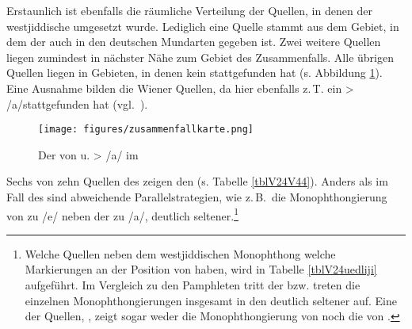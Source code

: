  
 Erstaunlich ist ebenfalls die räumliche Verteilung der Quellen, in denen der westjiddische  umgesetzt wurde. Lediglich eine Quelle stammt aus dem Gebiet, in dem der  auch in den deutschen Mundarten gegeben ist. Zwei weitere Quellen liegen zumindest in nächster Nähe zum Gebiet des Zusammenfalls. Alle übrigen Quellen liegen in Gebieten, in denen kein  stattgefunden hat (s. Abbildung \ref{karteV24V44}). Eine Ausnahme bilden die Wiener Quellen, da hier ebenfalls z.\,T. ein  > /a\textlengthmark/stattgefunden hat (vgl.\, \citealt[233, 235]{Schirmunski1962}).
 
 \begin{figure}
		\centering
\texttt{[image: figures/zusammenfallkarte.png]}
		\caption{\label{karteV24V44}  Der  von  u.  > /a\textlengthmark/ im }
		\end{figure}

 
Sechs von zehn Quellen des  zeigen den  (s. Tabelle \ref{tblV24V44}). Anders als im Fall des  sind abweichende Parallelstrategien, wie z.\,B.\, die Monophthongierung von  zu /e\textlengthmark/ neben der zu /a\textlengthmark/, deutlich seltener.\footnote{Welche Quellen neben dem westjiddischen Monophthong welche Markierungen an der Position von  haben, wird in Tabelle \ref{tblV24uedliji} aufgeführt. Im Vergleich zu den Pamphleten tritt der  bzw. treten die einzelnen Monophthongierungen insgesamt in den  deutlich seltener auf. Eine der Quellen, , zeigt sogar weder die Monophthongierung von  noch die von .}\\ %
 
